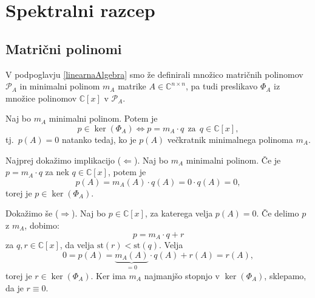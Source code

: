 \documentclass[mat1]{fmfdelo}
\newcommand{\C}{\mathbb C}
\begin{document}
\section{Spektralni razcep}
\subsection{Matrični polinomi}
V podpoglavju \ref{linearnaAlgebra} smo že definirali množico matričnih polinomov $\mathcal{P}_A$ in minimalni polinom $m_A$ matrike $A \in \C^{n \times n}$, pa tudi preslikavo $\Phi_A$ iz množice polinomov $\C [x]$ v $\mathcal{P}_A$.
\begin{trditev}\label{trditevMinimalniPolinom}
    Naj bo $m_A$ minimalni polinom. Potem je
    \begin{equation}
        p \in \ker (\Phi_A) \Leftrightarrow p = m_A \cdot q\ \  \text{za}\ \ q \in \C [x],
    \end{equation}
    tj.\ $p(A) = 0$ natanko tedaj, ko je $p(A)$ večkratnik minimalnega polinoma $m_A$.
\end{trditev}
\begin{dokaz}
    Najprej dokažimo implikacijo ($\Leftarrow$). Naj bo $m_A$ minimalni polinom. Če je $p = m_A\cdot q$ za nek $q \in \C [x]$, potem je
    \begin{equation}
        p(A) = m_A(A) \cdot q(A) = 0 \cdot q(A) = 0,
    \end{equation}
    torej je $p \in \ker(\Phi_A)$.
    
    Dokažimo še ($\Rightarrow$). Naj bo $p \in \C [x]$, za katerega velja $p(A) = 0$. Če delimo $p$ z $m_A$, dobimo:
    \begin{equation*}
        p = m_A \cdot q + r
    \end{equation*}
    za $q, r \in \C [x]$, da velja $\text{st}(r) < \text{st}(q)$. Velja
    \begin{equation*}
        0 = p(A) = \underbrace{m_A(A)}_{=0} \cdot q(A) + r(A) = r(A),
    \end{equation*}
    torej je $r \in \ker(\Phi_A)$. Ker ima $m_A$ najmanjšo stopnjo v $\ker(\Phi_A)$, sklepamo, da je $r \equiv 0$.
\end{dokaz}
\end{document}
